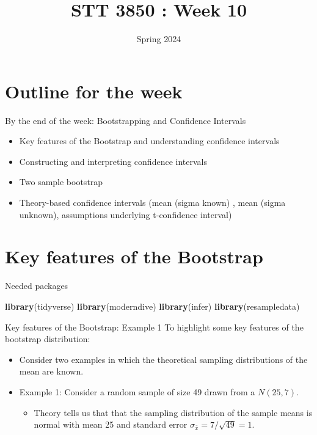 \documentclass[
  ignorenonframetext,
]{beamer}
\title{STT 3850 : Week 10}
\author{Spring 2024}
\date{}
\institute{Appalachian State University}
\newenvironment{Shaded}{\begin{snugshade}}{\end{snugshade}}
\newcommand{\FunctionTok}[1]{\textcolor[rgb]{0.13,0.29,0.53}{\textbf{#1}}}
\newcommand{\NormalTok}[1]{#1}
\providecommand{\tightlist}{%
  \setlength{\itemsep}{0pt}\setlength{\parskip}{0pt}}
\begin{document}
\frame{\titlepage}

\hypertarget{outline-for-the-week}{%
\section{Outline for the week}\label{outline-for-the-week}}

\begin{frame}{By the end of the week: Bootstrapping and Confidence
Intervals}
\protect\hypertarget{by-the-end-of-the-week-bootstrapping-and-confidence-intervals}{}
\begin{itemize}
\item
  Key features of the Bootstrap and understanding confidence intervals
\item
  Constructing and interpreting confidence intervals
\item
  Two sample bootstrap
\item
  Theory-based confidence intervals (mean (sigma known) , mean (sigma
  unknown), assumptions underlying t-confidence interval)
\end{itemize}
\end{frame}

\hypertarget{key-features-of-the-bootstrap}{%
\section{Key features of the
Bootstrap}\label{key-features-of-the-bootstrap}}

\begin{frame}[fragile]{Needed packages}
\protect\hypertarget{needed-packages}{}
\small

\begin{Shaded}
\begin{Highlighting}[]
\FunctionTok{library}\NormalTok{(tidyverse)}
\FunctionTok{library}\NormalTok{(moderndive)}
\FunctionTok{library}\NormalTok{(infer)}
\FunctionTok{library}\NormalTok{(resampledata)}
\end{Highlighting}
\end{Shaded}

\normalsize
\end{frame}

\begin{frame}{Key features of the Bootstrap: Example 1}
\protect\hypertarget{key-features-of-the-bootstrap-example-1}{}
To highlight some key features of the bootstrap distribution:

\begin{itemize}
\item
  Consider two examples in which the theoretical sampling distributions
  of the mean are known.
\item
  Example 1: Consider a random sample of size 49 drawn from a
  \(N(25, 7)\).

  \begin{itemize}
  \tightlist
  \item
    Theory tells us that that the sampling distribution of the sample
    means is normal with mean 25 and standard error
    \(\sigma_{\bar{x}}=7/\sqrt{49}=1\).
  \end{itemize}
\end{itemize}
\end{frame}
\end{document}
